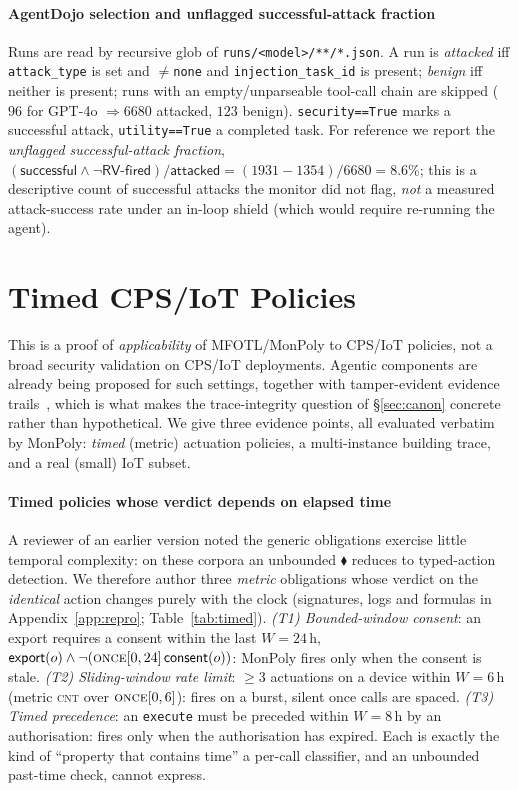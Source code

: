 \documentclass[sigconf]{acmart}
\begin{document}
\paragraph{AgentDojo selection and unflagged successful-attack fraction} Runs are read
by recursive glob of \texttt{runs/<model>/**/*.json}. A run is \emph{attacked} iff
\texttt{attack\_type} is set and $\neq$\texttt{none} and \texttt{injection\_task\_id}
is present; \emph{benign} iff neither is present; runs with an empty/unparseable
tool-call chain are skipped ($96$ for GPT-4o $\Rightarrow 6680$ attacked, $123$
benign). \texttt{security==True} marks a successful attack, \texttt{utility==True} a
completed task. For reference we report the \emph{unflagged successful-attack
fraction}, $(\textsf{successful}\wedge\neg\textsf{RV-fired})/\textsf{attacked}
=(1931-1354)/6680=8.6\%$; this is a descriptive count of successful attacks the
monitor did not flag, \emph{not} a measured attack-success rate under an in-loop
shield (which would require re-running the agent).

\section{Timed CPS/IoT Policies}
\label{sec:cps}

This is a proof of \emph{applicability} of MFOTL/MonPoly to CPS/IoT policies,
not a broad security validation on CPS/IoT deployments. Agentic components are already being proposed for such settings, together with tamper-evident evidence trails~\cite{resilagent2026}, which is what makes the trace-integrity question of \S\ref{sec:canon} concrete rather than hypothetical. We give three evidence points,
all evaluated verbatim by MonPoly: \emph{timed} (metric) actuation policies, a
multi-instance building trace, and a real (small) IoT subset.

\paragraph{Timed policies whose verdict depends on elapsed time} A reviewer of an
earlier version noted the generic obligations exercise little temporal complexity:
on these corpora an unbounded $\blacklozenge$ reduces to typed-action detection. We
therefore author three \emph{metric} obligations whose verdict on the \emph{identical}
action changes purely with the clock (signatures, logs and formulas in
Appendix~\ref{app:repro}; Table~\ref{tab:timed}). \emph{(T1) Bounded-window consent}:
an export requires a consent within the last $W{=}24$\,h,
$\mathsf{export}(o)\wedge\neg(\text{\textsc{once}}[0,24]\,\mathsf{consent}(o))$:
MonPoly fires only when the consent is stale. \emph{(T2) Sliding-window rate limit}:
$\ge 3$ actuations on a device within $W{=}6$\,h (metric \textsc{cnt} over
$\text{\textsc{once}}[0,6]$): fires on a burst, silent once calls are spaced.
\emph{(T3) Timed precedence}: an \texttt{execute} must be preceded within $W{=}8$\,h by
an authorisation: fires only when the authorisation has expired. Each is exactly
the kind of ``property that contains time'' a per-call classifier, and an unbounded
past-time check, cannot express.
\end{document}
